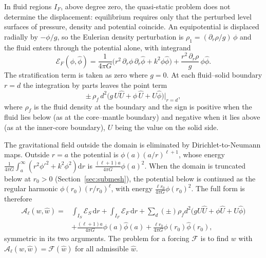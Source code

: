 \documentclass[11pt,a4paper]{article}
\newcommand{\dd}{\mathrm{d}}
\newcommand{\Ad}{\mathcal{A}_{\ell}}
\numberwithin{equation}{section}
\begin{document}
In fluid regions $I_{F}$, above degree zero, the quasi-static problem does not
determine the displacement: equilibrium requires only that the perturbed
level surfaces of pressure, density and potential coincide. An equipotential
is displaced radially by $-\phi/g$, so the Eulerian density perturbation is
$\rho_{1} = (\partial_{r}\rho/g)\,\phi$ and the fluid enters through the
potential alone, with integrand
\begin{equation}
\mathcal{E}_{F}(\phi,\hat\phi) = \frac{1}{4\pi G}\big(r^{2}\,\partial_{r}\phi\,\partial_{r}\hat\phi
 + k^{2}\phi\hat\phi\big) + \frac{r^{2}\,\partial_{r}\rho}{g}\,\phi\hat\phi.
\label{eq:fluidform}
\end{equation}
The stratification term is taken as zero where $g=0$. At each fluid--solid
boundary $r=d$ the integration by parts leaves the point term
\begin{equation}
\pm\,\rho_{f}\,d^{2}\big(g\,U\hat U + \phi\,\hat U + U\hat\phi\big)\big|_{r=d},
\label{eq:interface}
\end{equation}
where $\rho_{f}$ is the fluid density at the boundary and the sign is positive
when the fluid lies below (as at the core--mantle boundary) and negative when
it lies above (as at the inner-core boundary), $U$ being the value on the
solid side.

The gravitational field outside the domain is eliminated by Dirichlet-to-Neumann
maps. Outside $r=a$ the potential is $\phi(a)(a/r)^{\ell+1}$, whose energy
$\frac{1}{4\pi G}\int_{a}^{\infty}(r^{2}\phi'^{2}+k^{2}\phi^{2})\dd r$ is
$\frac{(\ell+1)a}{4\pi G}\phi(a)^{2}$. When the domain is truncated below at
$r_{0}>0$ (Section~\ref{sec:submesh}), the potential below is continued as the
regular harmonic $\phi(r_{0})(r/r_{0})^{\ell}$, with energy
$\frac{\ell r_{0}}{4\pi G}\phi(r_{0})^{2}$. The full form is therefore
\begin{equation}
\begin{aligned}
\Ad(w,\hat w) ={}& \int_{I_{S}}\mathcal{E}_{S}\,\dd r + \int_{I_{F}}\mathcal{E}_{F}\,\dd r
 + \sum_{d}(\pm)\rho_{f}d^{2}\big(gU\hat U+\phi\hat U+U\hat\phi\big)\\
&+ \frac{(\ell+1)a}{4\pi G}\phi(a)\hat\phi(a)
 + \frac{\ell r_{0}}{4\pi G}\phi(r_{0})\hat\phi(r_{0}),
\end{aligned}
\label{eq:fullform}
\end{equation}
symmetric in its two arguments. The problem for a forcing $\mathcal{F}$ is to
find $w$ with $\Ad(w,\hat w)=\mathcal{F}(\hat w)$ for all admissible $\hat w$.
\end{document}
